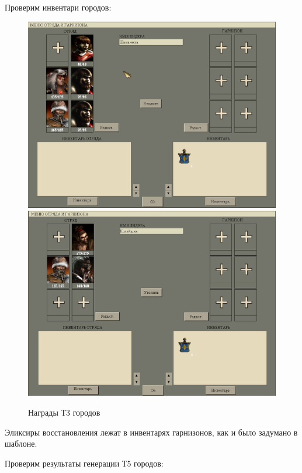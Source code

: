 Проверим инвентари городов:

\begin{figure}[H]
\center
\includegraphics[width=1.0\linewidth]{docImages/townT3Loot.png}
\includegraphics[width=1.0\linewidth]{docImages/townT3Loot2.png}
\caption{Награды Т3 городов}
\end{figure}

Эликсиры восстановления лежат в инвентарях гарнизонов, как и было задумано в шаблоне.

Проверим результаты генерации Т5 городов:

